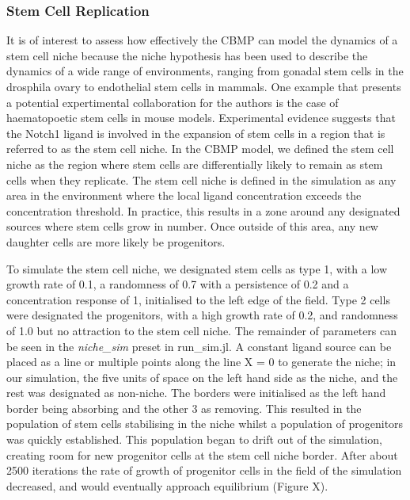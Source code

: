 \documentclass[12pt,a4paper]{report}
\begin{document}
\subsubsection{Stem Cell Replication}
It is of interest to assess how effectively the CBMP can model the 
dynamics of a stem cell niche because the niche hypothesis has been used 
to describe the dynamics of a wide range of environments, ranging from 
gonadal stem cells in the drosphila ovary to endothelial stem cells in 
mammals. One example that presents a potential expertimental 
collaboration for the authors is the case of haematopoetic stem cells in 
mouse models. Experimental evidence suggests that the Notch1 ligand is 
involved in the expansion of stem cells in a region that is referred to 
as the stem cell niche. In the CBMP model, we defined the stem cell 
niche as the region where stem cells are differentially likely to remain 
as stem cells when they replicate. The stem cell niche is defined in the 
simulation as any area in the environment where the local ligand 
concentration exceeds the concentration threshold. In practice, this 
results in a zone around any designated sources where stem cells grow in 
number. Once outside of this area, any new daughter cells are more 
likely be progenitors. 



To simulate the stem cell niche, we designated stem cells as type 1, 
with a low growth rate of 0.1, a randomness of 0.7 with a persistence of 
0.2 and a concentration response of 1, initialised to the left edge of 
the field. Type 2 cells were designated the progenitors, with a high 
growth rate of 0.2, and randomness of 1.0 but no attraction to the stem 
cell niche. The remainder of parameters can be seen in the {\itshape 
niche\_sim} preset in run\_sim.jl. A constant ligand source can be 
placed as a line or multiple points along the line X = 0 to generate the 
niche; in our simulation, the five units of space on the left hand side 
as the niche, and the rest was designated as non-niche. The borders were 
initialised as the left hand border being absorbing and the other 3 as 
removing. This resulted in the population of stem cells stabilising in 
the niche whilst a population of progenitors was quickly established. 
This population began to drift out of the simulation, creating room for 
new progenitor cells at the stem cell niche border. After about 2500 
iterations the rate of growth of progenitor cells in the field of the 
simulation decreased, and would eventually approach equilibrium (Figure 
X).
\end{document}
